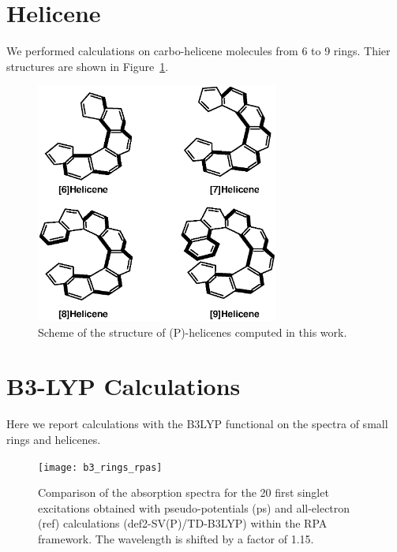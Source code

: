 \documentclass[aip]{revtex4-1}
\begin{document}
\clearpage

\section*{Helicene}

We performed calculations on carbo-helicene molecules from 6 to 9 rings. Thier structures are
shown in Figure~\ref{fig:helicene}.

\begin{figure}
\begin{center}
\includegraphics[width=8cm]{helicene.eps}
\end{center}
\vspace{0.25in}
\hspace*{3in}
\caption{Scheme of the structure of (P)-helicenes computed in this work.}
\label{fig:helicene}
\end{figure}


\clearpage
\section*{B3-LYP Calculations}

Here we report calculations with the B3LYP functional on the spectra of small rings and helicenes.

\begin{figure}[b]
\begin{center}
\texttt{[image: b3\_rings\_rpas]}
\end{center}
\hspace*{3in}
\caption{Comparison of the absorption spectra for the 20 first singlet excitations obtained with
pseudo-potentials (ps) and all-electron (ref) calculations (def2-SV(P)/TD-B3LYP) within the RPA
framework. The wavelength is shifted by a factor of 1.15.}
\label{fig:cnhn_uv_rpas_b3lyp}
\end{figure}
\end{document}
